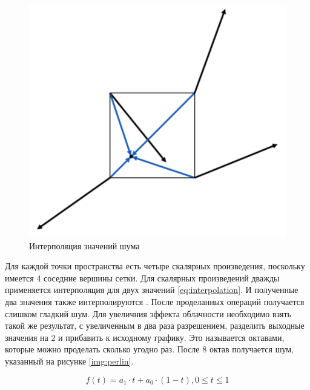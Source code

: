 \begin{figure}[H]
    \centering
    \includegraphics[scale=0.6]{img/interpolation.png}
    \caption{Интерполяция значений шума}
    \label{img:interpolation}
\end{figure}

Для каждой точки пространства есть четыре скалярных произведения, поскольку имеется 4 соседние вершины сетки.
Для скалярных произведений дважды применяется интерполяция для двух значений \ref{eq:interpolation}.
И полученные два значения также интерполируются \cite{Perlin}. После проделанных операций получается слишком
гладкий шум. Для увеличния эффекта облачности необходимо взять такой же результат, с увеличенным в два раза разрешением,
разделить выходные значения на $2$ и прибавить к исходному графику. Это называется октавами, которые можно проделать сколько угодно
раз. После 8 октав получается шум, указанный на рисунке \ref{img:perlin}.

\begin{equation}\label{eq:interpolation}
    f(t) = a_1 \cdot t + a_0 \cdot (1 - t), 0 \le t \le 1
\end{equation}

